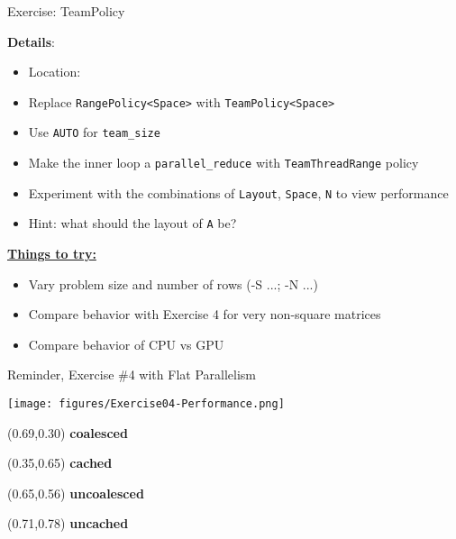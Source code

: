 \begin{frame}[fragile]{Exercise: TeamPolicy}

  \textbf{Details}:
  \begin{small}
  \begin{itemize}
\item Location: 
\item Replace \texttt{RangePolicy<Space>} with \texttt{TeamPolicy<Space>}
\item Use \texttt{AUTO} for \texttt{team\_size}
\item Make the inner loop a \texttt{parallel\_reduce} with \texttt{TeamThreadRange} policy
\item Experiment with the combinations of \texttt{Layout}, \texttt{Space}, \texttt{N} to view performance
\item Hint: what should the layout of \texttt{A} be?
\end{itemize}
  \end{small}

\ul{\textbf{Things to try:}}
  \begin{small}
  \begin{itemize}
  \item Vary problem size and number of rows (-S ...; -N ...)
  \item Compare behavior with Exercise 4 for very non-square matrices
  \item Compare behavior of CPU vs GPU
  \end{itemize}
  \end{small}

\end{frame}


\begin{frame}[fragile]{Reminder, Exercise \#4 with Flat Parallelism}

  \vspace{-5pt}
  \hspace{-15pt}
    \texttt{[image: figures/Exercise04-Performance.png]}
  \vspace{-15pt}

  \begin{textblock*}{0.5\textwidth}(0.69\textwidth,0.30\textheight)
    \textbf{coalesced}
  \end{textblock*}

  \begin{textblock*}{0.5\textwidth}(0.35\textwidth,0.65\textheight)
    \textbf{cached}
  \end{textblock*}

  \begin{textblock*}{0.5\textwidth}(0.65\textwidth,0.56\textheight)
    \textbf{uncoalesced}
  \end{textblock*}

  \begin{textblock*}{0.5\textwidth}(0.71\textwidth,0.78\textheight)
    \textbf{uncached}
  \end{textblock*}

\end{frame}

